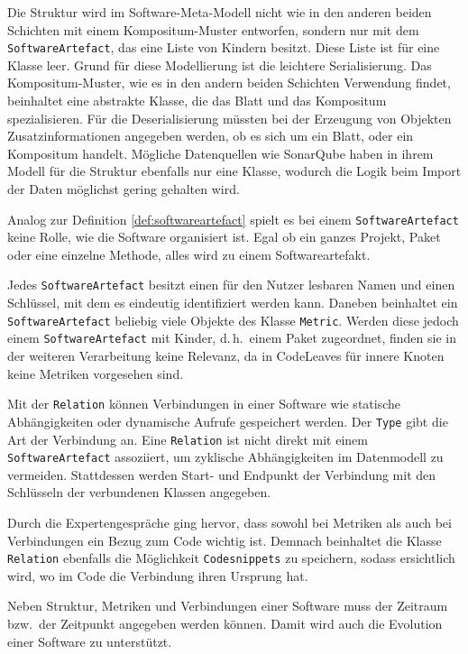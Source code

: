 Die Struktur wird im Software-Meta-Modell nicht wie in den anderen beiden Schichten mit einem Kompositum-Muster entworfen, sondern nur mit dem \texttt{SoftwareArtefact}, das eine Liste von Kindern besitzt. Diese Liste ist für eine Klasse leer. Grund für diese Modellierung ist die leichtere Serialisierung. Das Kompositum-Muster, wie es in den andern beiden Schichten Verwendung findet, beinhaltet eine abstrakte Klasse, die das Blatt und das Kompositum spezialisieren. Für die Deserialisierung müssten bei der Erzeugung von Objekten Zusatzinformationen angegeben werden, ob es sich um ein Blatt, oder ein Kompositum handelt. Mögliche Datenquellen wie SonarQube haben in ihrem Modell für die Struktur ebenfalls nur eine Klasse, wodurch die Logik beim Import der Daten möglichst gering gehalten wird.

Analog zur Definition \ref{def:softwareartefact} spielt es bei einem \texttt{SoftwareArtefact} keine Rolle, wie die Software organisiert ist. Egal ob ein ganzes Projekt, Paket oder eine einzelne Methode, alles wird zu einem Softwareartefakt.

Jedes \texttt{SoftwareArtefact} besitzt einen für den Nutzer lesbaren Namen und einen Schlüssel, mit dem es eindeutig identifiziert werden kann. Daneben beinhaltet ein \texttt{SoftwareArtefact} beliebig viele Objekte des Klasse \texttt{Metric}. Werden diese jedoch einem \texttt{SoftwareArtefact} mit Kinder, d.\,h.\ einem Paket zugeordnet, finden sie in der weiteren Verarbeitung keine Relevanz, da in CodeLeaves für innere Knoten keine Metriken vorgesehen sind.

Mit der \texttt{Relation} können Verbindungen in einer Software wie statische Abhängigkeiten oder dynamische Aufrufe gespeichert werden. Der \texttt{Type} gibt die Art der Verbindung an. Eine \texttt{Relation} ist nicht direkt mit einem \texttt{SoftwareArtefact} assoziiert, um zyklische Abhängigkeiten im Datenmodell zu vermeiden. Stattdessen werden Start- und Endpunkt der Verbindung mit den Schlüsseln der verbundenen Klassen angegeben.

Durch die Expertengespräche ging hervor, dass sowohl bei Metriken als auch bei Verbindungen ein Bezug zum Code wichtig ist. Demnach beinhaltet die Klasse \texttt{Relation} ebenfalls die Möglichkeit \texttt{Codesnippets} zu speichern, sodass ersichtlich wird, wo im Code die Verbindung ihren Ursprung hat.

Neben Struktur, Metriken und Verbindungen einer Software muss der Zeitraum bzw.\ der Zeitpunkt angegeben werden können. Damit wird auch die Evolution einer Software zu unterstützt.

